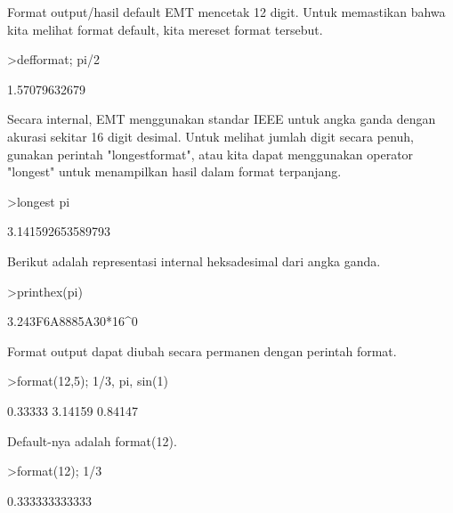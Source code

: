 \documentclass[a4paper,10pt]{article}
\begin{document}
\begin{eulernotebook}
\begin{eulercomment}
\begin{eulercomment}
\begin{eulercomment}
\begin{eulercomment}
\begin{eulercomment}
Format output/hasil default EMT mencetak 12 digit. Untuk memastikan
bahwa kita melihat format default, kita mereset format tersebut.
\end{eulercomment}
\begin{eulerprompt}
>defformat; pi/2
\end{eulerprompt}
\begin{euleroutput}
  1.57079632679
\end{euleroutput}
\begin{eulercomment}
Secara internal, EMT menggunakan standar IEEE untuk angka ganda dengan
akurasi sekitar 16 digit desimal. Untuk melihat jumlah digit secara
penuh, gunakan perintah "longestformat", atau kita dapat menggunakan
operator "longest" untuk menampilkan hasil dalam format terpanjang.
\end{eulercomment}
\begin{eulerprompt}
>longest pi
\end{eulerprompt}
\begin{euleroutput}
        3.141592653589793 
\end{euleroutput}
\begin{eulercomment}
Berikut adalah representasi internal heksadesimal dari angka ganda.
\end{eulercomment}
\begin{eulerprompt}
>printhex(pi)
\end{eulerprompt}
\begin{euleroutput}
  3.243F6A8885A30*16^0
\end{euleroutput}
\begin{eulercomment}
Format output dapat diubah secara permanen dengan perintah format.
\end{eulercomment}
\begin{eulerprompt}
>format(12,5); 1/3, pi, sin(1)
\end{eulerprompt}
\begin{euleroutput}
      0.33333 
      3.14159 
      0.84147 
\end{euleroutput}
\begin{eulercomment}
Default-nya adalah format(12).
\end{eulercomment}
\begin{eulerprompt}
>format(12); 1/3
\end{eulerprompt}
\begin{euleroutput}
  0.333333333333
\end{euleroutput}

\end{eulercomment}
\end{eulercomment}
\end{eulercomment}
\end{eulercomment}
\end{eulernotebook}
\end{document}
